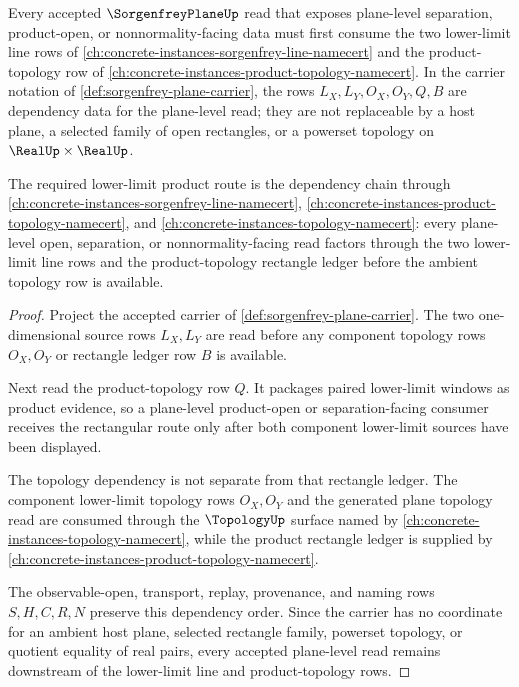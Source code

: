 \begin{theorem}
\label{thm:sorgenfrey-plane-lower-limit-product-dependency-route}
Every accepted $\SorgenfreyPlaneUp$ read that exposes plane-level separation, product-open, or nonnormality-facing data must first consume the two lower-limit line rows of \autoref{ch:concrete-instances-sorgenfrey-line-namecert} and the product-topology row of \autoref{ch:concrete-instances-product-topology-namecert}. In the carrier notation of \autoref{def:sorgenfrey-plane-carrier}, the rows $L_X,L_Y,O_X,O_Y,Q,B$ are dependency data for the plane-level read; they are not replaceable by a host plane, a selected family of open rectangles, or a powerset topology on $\RealUp\times\RealUp$.

The required lower-limit product route is the dependency chain through \autoref{ch:concrete-instances-sorgenfrey-line-namecert}, \autoref{ch:concrete-instances-product-topology-namecert}, and \autoref{ch:concrete-instances-topology-namecert}: every plane-level open, separation, or nonnormality-facing read factors through the two lower-limit line rows and the product-topology rectangle ledger before the ambient topology row is available.
\end{theorem}
\begin{proof}
Project the accepted carrier of \autoref{def:sorgenfrey-plane-carrier}. The two one-dimensional source rows $L_X,L_Y$ are read before any component topology rows $O_X,O_Y$ or rectangle ledger row $B$ is available.

Next read the product-topology row $Q$. It packages paired lower-limit windows as product evidence, so a plane-level product-open or separation-facing consumer receives the rectangular route only after both component lower-limit sources have been displayed.

The topology dependency is not separate from that rectangle ledger. The component lower-limit topology rows $O_X,O_Y$ and the generated plane topology read are consumed through the $\TopologyUp$ surface named by \autoref{ch:concrete-instances-topology-namecert}, while the product rectangle ledger is supplied by \autoref{ch:concrete-instances-product-topology-namecert}.

The observable-open, transport, replay, provenance, and naming rows $S,H,C,R,N$ preserve this dependency order. Since the carrier has no coordinate for an ambient host plane, selected rectangle family, powerset topology, or quotient equality of real pairs, every accepted plane-level read remains downstream of the lower-limit line and product-topology rows.
\end{proof}
